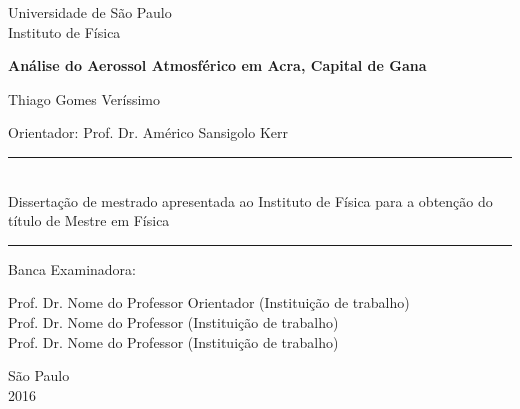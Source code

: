 \begin{titlepage}
\setlength{\voffset}{0pt}
\setlength{\hoffset}{0pt}
\centering
\Large{Universidade de São Paulo \\
Instituto de Física}


\LARGE{\bf Análise do Aerossol Atmosférico em Acra, Capital de Gana
}


\Large{ Thiago Gomes Veríssimo
}


\begin{flushright}

\begin{minipage}{.6\textwidth}
\large{Orientador: Prof. Dr. Américo Sansigolo Kerr
}
\end{minipage}


\begin{minipage}{.6\textwidth}
\rule{\linewidth}{0.5mm}\\
\large{
Dissertação de mestrado apresentada ao Instituto de Física para a obtenção do 
título de Mestre em Física
}

\rule{\linewidth}{0.5mm}
\end{minipage}
\end{flushright}


\begin{flushleft}

\normalsize
Banca Examinadora:\\
\hspace{.03\textwidth}\begin{minipage}{.97\textwidth}
Prof. Dr. Nome do Professor Orientador (Instituição de trabalho) \\
Prof. Dr. Nome do Professor (Instituição de trabalho) \\
Prof. Dr. Nome do Professor (Instituição de trabalho) \\
\end{minipage}
\end{flushleft}


São Paulo\\
2016

\end{titlepage}

